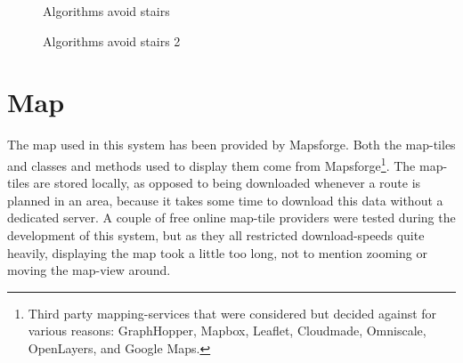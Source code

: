 \begin{figure}
	\centering
	\caption{Algorithms avoid stairs}
	\label{fig:avoidStairs}
\end{figure}
\begin{figure}
	\centering
	\caption{Algorithms avoid stairs 2}
	\label{fig:avoidStairs2}
\end{figure}

\newpage
\section{Map}
The map used in this system has been provided by Mapsforge\cite{Mapsforge,Mapsforge_map-tiles}. Both the map-tiles and classes and methods used to display them come from Mapsforge\footnote{Third party mapping-services that were considered but decided against for various reasons: GraphHopper\cite{Graphhopper}, Mapbox\cite{mapbox}, Leaflet\cite{leaflet}, Cloudmade\cite{cloudmade}, Omniscale\cite{omniscale}, OpenLayers\cite{openlayers}, and Google Maps\cite{GoogleMaps}.}.
The map-tiles are stored locally, as opposed to being downloaded whenever a route is planned in an area, because it takes some time to download this data without a dedicated server. A couple of free online map-tile providers were tested during the development of this system, but as they all restricted download-speeds quite heavily, displaying the map took a little too long, not to mention zooming or moving the map-view around.

